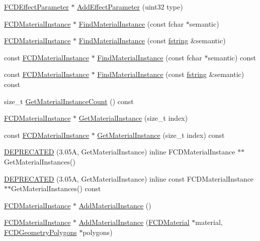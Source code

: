 \begin{DoxyCompactItemize}
\item 
\hyperlink{classFCDEffectParameter}{FCDEffectParameter} $\ast$ \hyperlink{classFCDGeometryInstance_a7c0b0c60e965233a022a44f86f5d3fb6}{AddEffectParameter} (uint32 type)
\item 
\hyperlink{classFCDMaterialInstance}{FCDMaterialInstance} $\ast$ \hyperlink{classFCDGeometryInstance_ac9d105a74407a7e184cc69049f7255d6}{FindMaterialInstance} (const fchar $\ast$semantic)
\item 
\hyperlink{classFCDMaterialInstance}{FCDMaterialInstance} $\ast$ \hyperlink{classFCDGeometryInstance_a4f07ed4cac509b46bc36d5f8aa94a4fe}{FindMaterialInstance} (const \hyperlink{classfm_1_1stringT}{fstring} \&semantic)
\item 
const \hyperlink{classFCDMaterialInstance}{FCDMaterialInstance} $\ast$ \hyperlink{classFCDGeometryInstance_a902fad54ae3522d5f315ff11974f33c8}{FindMaterialInstance} (const fchar $\ast$semantic) const 
\item 
const \hyperlink{classFCDMaterialInstance}{FCDMaterialInstance} $\ast$ \hyperlink{classFCDGeometryInstance_ad49c53b2a8bea739087f8894d86c5656}{FindMaterialInstance} (const \hyperlink{classfm_1_1stringT}{fstring} \&semantic) const 
\item 
size\_\-t \hyperlink{classFCDGeometryInstance_aa2398e94e5c6fa59363ab7b8cda7963e}{GetMaterialInstanceCount} () const 
\item 
\hyperlink{classFCDMaterialInstance}{FCDMaterialInstance} $\ast$ \hyperlink{classFCDGeometryInstance_a939d30cc2f135b3514423cc6850e2de4}{GetMaterialInstance} (size\_\-t index)
\item 
const \hyperlink{classFCDMaterialInstance}{FCDMaterialInstance} $\ast$ \hyperlink{classFCDGeometryInstance_abd29f3069119a9533912c97b76c5cb63}{GetMaterialInstance} (size\_\-t index) const 
\item 
\hyperlink{classFCDGeometryInstance_a74e65effbdfb12d07d2cc368265e7184}{DEPRECATED} (3.05A, GetMaterialInstance) inline FCDMaterialInstance $\ast$$\ast$GetMaterialInstances()
\item 
\hyperlink{classFCDGeometryInstance_a0f715f31b0dd4769d029c074d0e5cf1b}{DEPRECATED} (3.05A, GetMaterialInstance) inline const FCDMaterialInstance $\ast$$\ast$GetMaterialInstances() const 
\item 
\hyperlink{classFCDMaterialInstance}{FCDMaterialInstance} $\ast$ \hyperlink{classFCDGeometryInstance_ab98ebf13af872c2b7c924d8d74259f39}{AddMaterialInstance} ()
\item 
\hyperlink{classFCDMaterialInstance}{FCDMaterialInstance} $\ast$ \hyperlink{classFCDGeometryInstance_aa16524750451e06170533e0a107f84c3}{AddMaterialInstance} (\hyperlink{classFCDMaterial}{FCDMaterial} $\ast$material, \hyperlink{classFCDGeometryPolygons}{FCDGeometryPolygons} $\ast$polygons)

\end{DoxyCompactItemize}
